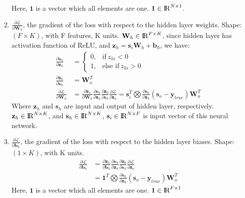 \documentclass[10pt,letterpaper]{article}
\begin{document}
\begin{enumerate}
  Here, $\textbf{1}$ is a vector which all elements are one. $\textbf{1} \in {\rm I\!R}^{N\times 1}$.
  
  
  
  
  \item $\frac{\partial \mathcal{L}}{\partial  \textbf{W}_h}$, the gradient of the loss with respect to the hidden layer weights. Shape: $(F \times K)$, with F features, K units. $\textbf{W}_h\in {\rm I\!R}^{F\times K}$, since hidden layer has activation function of ReLU, and $ \textbf{z}_{h} = \textbf{s}_{i}\textbf{W}_{h} + \textbf{b}_{h}$, we have:
  \begin{align*}
      \frac{\partial \textbf{s}_{h}}{\partial  \textbf{z}_{h}} &=   \begin{cases}
      0, & \text{if}\ z_{hi}<0 \\
      1, & \text{else if}\ z_{hi}>0
    \end{cases} \\
    \frac{\partial \textbf{z}_{0}}{\partial  \textbf{s}_{h}} &= \textbf{W}_{o}^{T} \\
          \frac{\partial \mathcal{L}}{\partial  \textbf{W}_{h}} &=\frac{\partial \textbf{z}_{h}}{\partial  \textbf{W}_{h}} \frac{\partial \textbf{s}_{h}}{\partial  \textbf{z}_{h}}\frac{\partial \textbf{z}_{0}}{\partial  \textbf{s}_{h}}\frac{\partial \mathcal{L}}{\partial  \textbf{z}_{o}} = \textbf{s}_{i}^{T}\bigotimes \frac{\partial \textbf{s}_{h}}{\partial  \textbf{z}_{h}} (\textbf{s}_{o} - \textbf{y}_{true})\textbf{W}_{o}^{T}
  \end{align*}
  Where $\textbf{z}_{h}$ and $\textbf{s}_{h}$ are input and output of hidden layer, respectively. $\textbf{z}_{h} \in {\rm I\!R}^{N\times K}$, and $\textbf{s}_{h} \in {\rm I\!R}^{N\times K}$, $\textbf{s}_{i}\in {\rm I\!R}^{N\times F}$ is input vector of this neural network. 
    
  \item $\frac{\partial \mathcal{L}}{\partial  \textbf{b}_h}$, the gradient of the loss with respect to the hidden layer biases. Shape: $(1 \times K)$, with K units.
  \begin{align*}
          \frac{\partial \mathcal{L}}{\partial  \textbf{b}_{h}} &=\frac{\partial \textbf{z}_{h}}{\partial  \textbf{b}_{h}} \frac{\partial \textbf{s}_{h}}{\partial  \textbf{z}_{h}}\frac{\partial \textbf{z}_{0}}{\partial  \textbf{s}_{h}}\frac{\partial \mathcal{L}}{\partial  \textbf{z}_{o}}\\ &=\textbf{1}^{T}\bigotimes\frac{\partial \textbf{s}_{h}}{\partial  \textbf{z}_{h}} (\textbf{s}_{o} - \textbf{y}_{true})\textbf{W}_{o}^{T}
  \end{align*}
  Here, $\textbf{1}$ is a vector which all elements are one. $\textbf{1} \in {\rm I\!R}^{F\times 1}$
  
  
\end{enumerate}
\end{document}
